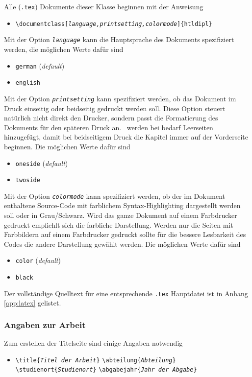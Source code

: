 Alle (\verb!.tex!) Dokumente dieser Klasse beginnen mit der Anweisung
%
\begin{itemize}
\item[] \verb!\documentclass[!\texttt{\emph{language,printsetting,colormode}}\verb!]{htldipl}! 
\end{itemize}
%
Mit der Option \texttt{\emph{language}} kann die Hauptsprache des Dokuments spezifiziert werden, 
die möglichen Werte dafür sind
%
\begin{itemize}
\item[] \verb!german! (\emph{default})
\item[] \verb!english!
\end{itemize}

Mit der Option \texttt{\emph{printsetting}} kann spezifiziert werden, ob das Dokument im Druck einseitig oder beidseitig gedruckt werden soll. Diese Option steuert natürlich nicht direkt den Drucker, sondern passt die Formatierung des Dokuments für den späteren Druck an. \ZB\ werden bei bedarf Leerseiten hinzugefügt, damit bei beidseitigem Druck die Kapitel immer auf der Vorderseite beginnen.
Die möglichen Werte dafür sind
%
\begin{itemize}
\item[] \verb!oneside! (\emph{default})
\item[] \verb!twoside!
\end{itemize}
%
Mit der Option \texttt{\emph{colormode}} kann spezifiziert werden, ob der im Dokument enthaltene Source-Code mit farblichem Syntax-Highlighting dargestellt werden soll oder in Grau/Schwarz. Wird das ganze Dokument auf einem Farbdrucker gedruckt empfiehlt sich die farbliche Darstellung. Werden nur die Seiten mit Farbbildern auf einem Farbdrucker gedruckt sollte für die bessere Lesbarkeit des Codes die andere Darstellung gewählt werden.
Die möglichen Werte dafür sind
%
\begin{itemize}
\item[] \verb!color! (\emph{default})
\item[] \verb!black!
\end{itemize}
%
Der vollständige Quelltext für eine entsprechende \verb!.tex! Hauptdatei ist in Anhang \ref{app:latex} 
gelistet.


\subsubsection{Angaben zur Arbeit}

Zum erstellen der Titelseite sind einige Angaben notwendig \zB\:
%
\begin{itemize}
\item[] %
\verb!\title{!\texttt{\em Titel der Arbeit}\verb!}! \newline%
\verb!\abteilung{!\texttt{\em Abteilung}\verb!}! \newline%
\verb!\studienort{!\texttt{\em Studienort}\verb!}! \newline%
\verb!\abgabejahr{!\texttt{\em Jahr der Abgabe}\verb!}!
\end{itemize}
%

